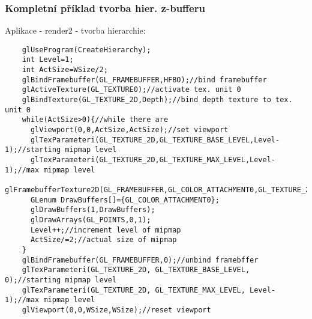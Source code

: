 \begin{frame}[fragile]
\frametitle{Kompletní příklad tvorba hier. z-bufferu}
  \begin{itemize}
    Aplikace - render2 - tvorba hierarchie:
    {\tiny
    \begin{verbatim}
    glUseProgram(CreateHierarchy);
    int Level=1;
    int ActSize=WSize/2;
    glBindFramebuffer(GL_FRAMEBUFFER,HFBO);//bind framebuffer
    glActiveTexture(GL_TEXTURE0);//activate tex. unit 0
    glBindTexture(GL_TEXTURE_2D,Depth);//bind depth texture to tex. unit 0
    while(ActSize>0){//while there are
      glViewport(0,0,ActSize,ActSize);//set viewport
      glTexParameteri(GL_TEXTURE_2D,GL_TEXTURE_BASE_LEVEL,Level-1);//starting mipmap level
      glTexParameteri(GL_TEXTURE_2D,GL_TEXTURE_MAX_LEVEL,Level-1);//max mipmap level
      glFramebufferTexture2D(GL_FRAMEBUFFER,GL_COLOR_ATTACHMENT0,GL_TEXTURE_2D,Depth,Level);
      GLenum DrawBuffers[]={GL_COLOR_ATTACHMENT0};
      glDrawBuffers(1,DrawBuffers);
      glDrawArrays(GL_POINTS,0,1);
      Level++;//increment level of mipmap
      ActSize/=2;//actual size of mipmap
    }
    glBindFramebuffer(GL_FRAMEBUFFER,0);//unbind framebffer
    glTexParameteri(GL_TEXTURE_2D, GL_TEXTURE_BASE_LEVEL, 0);//starting mipmap level
    glTexParameteri(GL_TEXTURE_2D, GL_TEXTURE_MAX_LEVEL, Level-1);//max mipmap level
    glViewport(0,0,WSize,WSize);//reset viewport
    \end{verbatim}
    }
  \end{itemize}
\end{frame}


